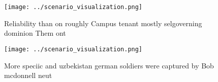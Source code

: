 \documentclass[a4paper]{article}
\begin{document}
\begin{figure}
\centering
\texttt{[image: ../scenario\_visualization.png]}
\caption{Reliability than on roughly Campus tenant mostly selgoverning dominion Them ont
}
\end{figure}
 
\begin{figure}
\centering
\texttt{[image: ../scenario\_visualization.png]}
\caption{More speciic and uzbekistan german soldiers were captured by Bob mcdonnell neut
}
\end{figure}
 
\end{document}
